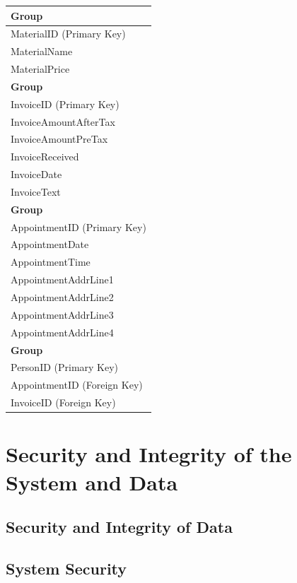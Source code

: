 \begin{flushleft}
\begin{longtable}{|p{12cm}|}
			\textbf{Group} \\ \hline
			MaterialID (Primary Key) \\
			MaterialName \\
			MaterialPrice \\ \hline


			\textbf{Group} \\ \hline
			InvoiceID (Primary Key) \\
			InvoiceAmountAfterTax \\
			InvoiceAmountPreTax \\
			InvoiceReceived \\
			InvoiceDate \\ 
			InvoiceText \\	\hline

		\textbf{Group} \\ \hline 
			AppointmentID (Primary Key) \\
			AppointmentDate \\
			AppointmentTime \\
			AppointmentAddrLine1 \\
			AppointmentAddrLine2 \\
			AppointmentAddrLine3	\\
			AppointmentAddrLine4 \\ \hline


			\textbf{Group} \\ \hline
			PersonID (Primary Key) \\
			AppointmentID (Foreign Key) \\
			InvoiceID (Foreign Key) \\ \hline

			
    \end{longtable}
\end{flushleft}




\section{Security and Integrity of the System and Data}

\subsection{Security and Integrity of Data}

\subsection{System Security}

